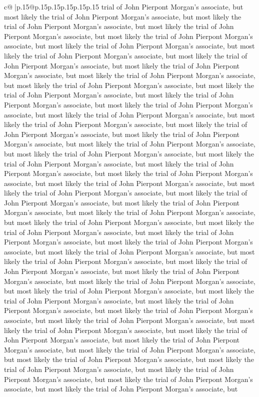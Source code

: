 \documentclass{article}
\begin{document}
{\begin{supertabular}{c@{$\;$}|p{.15\linewidth}@{}p{.15\linewidth}p{.15\linewidth}p{.15\linewidth}p{.15\linewidth}p{.15\linewidth}}
{{{trial of John Pierpont Morgan's associate, but most likely the trial of John Pierpont Morgan's associate, but most likely the trial of John Pierpont Morgan's associate, but most likely the trial of John Pierpont Morgan's associate, but most likely the trial of John Pierpont Morgan's associate, but most likely the trial of John Pierpont Morgan's associate, but most likely the trial of John Pierpont Morgan's associate, but most likely the trial of John Pierpont Morgan's associate, but most likely the trial of John Pierpont Morgan's associate, but most likely the trial of John Pierpont Morgan's associate, but most likely the trial of John Pierpont Morgan's associate, but most likely the trial of John Pierpont Morgan's associate, but most likely the trial of John Pierpont Morgan's associate, but most likely the trial of John Pierpont Morgan's associate, but most likely the trial of John Pierpont Morgan's associate, but most likely the trial of John Pierpont Morgan's associate, but most likely the trial of John Pierpont Morgan's associate, but most likely the trial of John Pierpont Morgan's associate, but most likely the trial of John Pierpont Morgan's associate, but most likely the trial of John Pierpont Morgan's associate, but most likely the trial of John Pierpont Morgan's associate, but most likely the trial of John Pierpont Morgan's associate, but most likely the trial of John Pierpont Morgan's associate, but most likely the trial of John Pierpont Morgan's associate, but most likely the trial of John Pierpont Morgan's associate, but most likely the trial of John Pierpont Morgan's associate, but most likely the trial of John Pierpont Morgan's associate, but most likely the trial of John Pierpont Morgan's associate, but most likely the trial of John Pierpont Morgan's associate, but most likely the trial of John Pierpont Morgan's associate, but most likely the trial of John Pierpont Morgan's associate, but most likely the trial of John Pierpont Morgan's associate, but most likely the trial of John Pierpont Morgan's associate, but most likely the trial of John Pierpont Morgan's associate, but most likely the trial of John Pierpont Morgan's associate, but most likely the trial of John Pierpont Morgan's associate, but most likely the trial of John Pierpont Morgan's associate, but most likely the trial of John Pierpont Morgan's associate, but most likely the trial of John Pierpont Morgan's associate, but most likely the trial of John Pierpont Morgan's associate, but most likely the trial of John Pierpont Morgan's associate, but most likely the trial of John Pierpont Morgan's associate, but most likely the trial of John Pierpont Morgan's associate, but most likely the trial of John Pierpont Morgan's associate, but most likely the trial of John Pierpont Morgan's associate, but most likely the trial of John Pierpont Morgan's associate, but most likely the trial of John Pierpont Morgan's associate, but most likely the trial of John Pierpont Morgan's associate, but most likely the trial of John Pierpont Morgan's associate, but most likely the trial of John Pierpont Morgan's associate, but most likely the trial of John Pierpont Morgan's associate, but }}}
\end{supertabular}}
\end{document}
